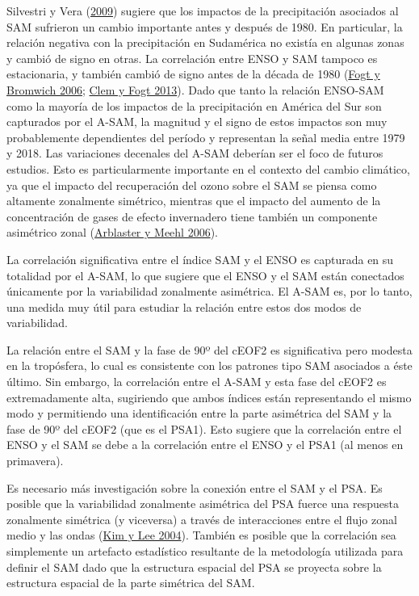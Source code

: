 \documentclass[12pt,oneside,a4paper]{reedthesis}
\begin{document}
Silvestri y Vera (\protect\hyperlink{ref-silvestri2009}{2009}) sugiere que los impactos de la precipitación asociados al SAM sufrieron un cambio importante antes y después de 1980.
En particular, la relación negativa con la precipitación en Sudamérica no existía en algunas zonas y cambió de signo en otras.
La correlación entre ENSO y SAM tampoco es estacionaria, y también cambió de signo antes de la década de 1980 (\protect\hyperlink{ref-fogt2006}{Fogt y Bromwich 2006}; \protect\hyperlink{ref-clem2013}{Clem y Fogt 2013}).
Dado que tanto la relación ENSO-SAM como la mayoría de los impactos de la precipitación en América del Sur son capturados por el A-SAM, la magnitud y el signo de estos impactos son muy probablemente dependientes del período y representan la señal media entre 1979 y 2018.
Las variaciones decenales del A-SAM deberían ser el foco de futuros estudios.
Esto es particularmente importante en el contexto del cambio climático, ya que el impacto del recuperación del ozono sobre el SAM se piensa como altamente zonalmente simétrico, mientras que el impacto del aumento de la concentración de gases de efecto invernadero tiene también un componente asimétrico zonal (\protect\hyperlink{ref-arblaster2006}{Arblaster y Meehl 2006}).

La correlación significativa entre el índice SAM y el ENSO es capturada en su totalidad por el A-SAM, lo que sugiere que el ENSO y el SAM están conectados únicamente por la variabilidad zonalmente asimétrica.
El A-SAM es, por lo tanto, una medida muy útil para estudiar la relación entre estos dos modos de variabilidad.

La relación entre el SAM y la fase de 90º del cEOF2 es significativa pero modesta en la tropósfera, lo cual es consistente con los patrones tipo SAM asociados a éste último.
Sin embargo, la correlación entre el A-SAM y esta fase del cEOF2 es extremadamente alta, sugiriendo que ambos índices están representando el mismo modo y permitiendo una identificación entre la parte asimétrica del SAM y la fase de 90º del cEOF2 (que es el PSA1).
Esto sugiere que la correlación entre el ENSO y el SAM se debe a la correlación entre el ENSO y el PSA1 (al menos en primavera).

Es necesario más investigación sobre la conexión entre el SAM y el PSA.
Es posible que la variabilidad zonalmente asimétrica del PSA fuerce una respuesta zonalmente simétrica (y viceversa) a través de interacciones entre el flujo zonal medio y las ondas (\protect\hyperlink{ref-kim2004}{Kim y Lee 2004}).
También es posible que la correlación sea simplemente un artefacto estadístico resultante de la metodología utilizada para definir el SAM dado que la estructura espacial del PSA se proyecta sobre la estructura espacial de la parte simétrica del SAM.
\end{document}
